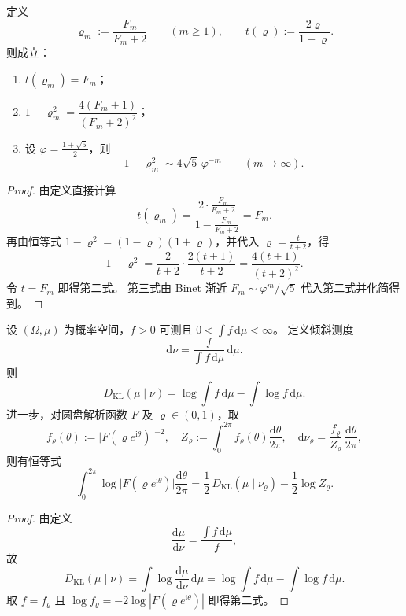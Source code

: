 \begin{conclusion}\label{con:cdim-fibonacci-radius-time-conjugacy}
定义
\[
\varrho_m:=\frac{F_m}{F_m+2}\qquad(m\ge 1),
\qquad
t(\varrho):=\frac{2\varrho}{1-\varrho}.
\]
则成立：
\begin{enumerate}
  \item \(t(\varrho_m)=F_m\)；
  \item \(1-\varrho_m^2=\dfrac{4(F_m+1)}{(F_m+2)^2}\)；
  \item 设 \(\varphi=\frac{1+\sqrt5}{2}\)，则
  \[
  1-\varrho_m^2\sim 4\sqrt5\,\varphi^{-m}\qquad(m\to\infty).
  \]
\end{enumerate}
\end{conclusion}
\begin{proof}
由定义直接计算
\[
t(\varrho_m)
=
\frac{2\cdot \frac{F_m}{F_m+2}}{1-\frac{F_m}{F_m+2}}
=
F_m.
\]
再由恒等式 \(1-\varrho^2=(1-\varrho)(1+\varrho)\)，并代入 \(\varrho=\frac{t}{t+2}\)，得
\[
1-\varrho^2
=
\frac{2}{t+2}\cdot\frac{2(t+1)}{t+2}
=
\frac{4(t+1)}{(t+2)^2}.
\]
令 \(t=F_m\) 即得第二式。
第三式由 Binet 渐近 \(F_m\sim \varphi^m/\sqrt5\) 代入第二式并化简得到。
\end{proof}

\begin{conclusion}\label{con:cdim-jensen-average-reverse-kl-splitting}
设 \((\Omega,\mu)\) 为概率空间，\(f>0\) 可测且 \(0<\int f\,\mathrm d\mu<\infty\)。
定义倾斜测度
\[
\mathrm d\nu=\frac{f}{\int f\,\mathrm d\mu}\,\mathrm d\mu.
\]
则
\[
D_{\mathrm{KL}}(\mu\mid \nu)=\log\!\int f\,\mathrm d\mu-\int \log f\,\mathrm d\mu.
\]
进一步，对圆盘解析函数 \(F\) 及 \(\varrho\in(0,1)\)，取
\[
f_\varrho(\theta):=\bigl|F(\varrho e^{\mathrm i\theta})\bigr|^{-2},
\quad
Z_\varrho:=\int_0^{2\pi}f_\varrho(\theta)\frac{\mathrm d\theta}{2\pi},
\quad
\mathrm d\nu_\varrho=\frac{f_\varrho}{Z_\varrho}\,\frac{\mathrm d\theta}{2\pi},
\]
则有恒等式
\[
\int_0^{2\pi}\log\bigl|F(\varrho e^{\mathrm i\theta})\bigr|\frac{\mathrm d\theta}{2\pi}
=
\frac12\,D_{\mathrm{KL}}(\mu\mid \nu_\varrho)-\frac12\log Z_\varrho.
\]
\end{conclusion}
\begin{proof}
由定义
\[
\frac{\mathrm d\mu}{\mathrm d\nu}
=
\frac{\int f\,\mathrm d\mu}{f},
\]
故
\[
D_{\mathrm{KL}}(\mu\mid\nu)
=
\int \log\frac{\mathrm d\mu}{\mathrm d\nu}\,\mathrm d\mu
=
\log\!\int f\,\mathrm d\mu-\int\log f\,\mathrm d\mu.
\]
取 \(f=f_\varrho\) 且 \(\log f_\varrho=-2\log|F(\varrho e^{\mathrm i\theta})|\) 即得第二式。
\end{proof}

